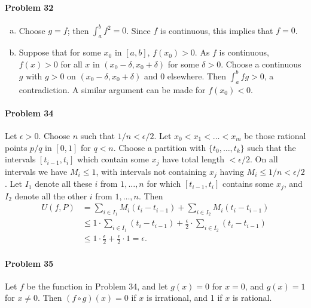 \documentclass{article}
\begin{document}
\paragraph{Problem 32}
\begin{enumerate}[(a)]
  \item Choose $g = f$; then $\int_a^b f^2 = 0$. Since $f$ is continuous, this
    implies that $f = 0$.
  \item Suppose that for some $x_0$ in $[a, b]$, $f(x_0) > 0$. As $f$ is
    continuous, $f(x) > 0$ for all $x$ in $(x_0 - \delta, x_0 + \delta)$ for
    some $\delta > 0$. Choose a continuous $g$ with $g > 0$ on $(x_0 - \delta,
    x_0 + \delta)$ and 0 elsewhere. Then $\int_a^b fg > 0$, a contradiction. A
    similar argument can be made for $f(x_0) < 0$.
\end{enumerate}

\paragraph{Problem 34} Let $\epsilon > 0$. Choose $n$ such that $1/n <
\epsilon/2$. Let $x_0 < x_1 < \ldots < x_m$ be those rational points $p/q$ in
$[0, 1]$ for $q < n$. Choose a partition with $\{t_0, \ldots, t_k\}$ such that
the intervals $[t_{i-1}, t_i]$ which contain some $x_j$ have total length $<
\epsilon/2$. On all intervals we have $M_i \leq 1$, with intervals not
containing $x_j$ having $M_i \leq 1/n < \epsilon/2$. Let $I_1$ denote all
these $i$ from $1, \ldots, n$ for which $[t_{i-1}, t_i]$ contains some $x_j$,
and $I_2$ denote all the other $i$ from $1, \ldots, n$. Then \begin{align*}
  U(f, P)
  &= \sum_{i \in I_1} M_i(t_i - t_{i-1}) + \sum_{i \in I_2} M_i(t_i - t_{i-1})
  \\
  &\leq 1 \cdot \sum_{i \in I_1} (t_i - t_{i-1}) + \frac{\epsilon}{2} \cdot
  \sum_{i \in I_2} (t_i - t_{i-1}) \\
  &\leq 1 \cdot \frac{\epsilon}{2} + \frac{\epsilon}{2} \cdot 1 = \epsilon.
\end{align*}

\paragraph{Problem 35} Let $f$ be the function in Problem 34, and let $g(x) =
0$ for $x = 0$, and $g(x) = 1$ for $x \neq 0$. Then $(f \circ g)(x) = 0$ if $x$
is irrational, and 1 if $x$ is rational.
\end{document}
